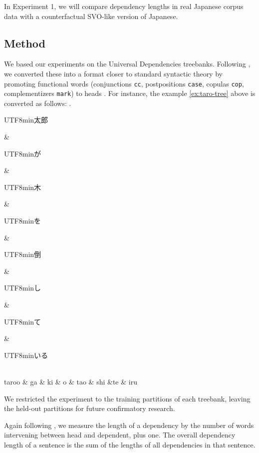 \documentclass[11pt,a4paper]{article}
\newcommand{\japanese}[1]{\begin{CJK}{UTF8}{min}#1\end{CJK}}
\begin{document}
In Experiment 1, we will compare dependency lengths in real Japanese corpus data with a counterfactual SVO-like version of Japanese.

\subsection{Method}

We based our experiments on the Universal Dependencies treebanks.
Following \cite{futrell2015largescale}, we converted these into a format closer to standard syntactic theory by promoting functional words
(conjunctions \texttt{cc}, 
postpositions \texttt{case},
copulas \texttt{cop},
complementizers \texttt{mark}) to heads \citep{osborne2019status}.
For instance, the example \ref{ex:taro-tree} above is converted as follows:
\ex.
\begin{dependency}[theme = simple]
   \begin{deptext}[column sep=1em]
          \japanese{太郎} \& \japanese{が} \& \japanese{木} \& \japanese{を} \& \japanese{倒} \& \japanese{し} \& \japanese{て} \& \japanese{いる} \\
          taroo \& ga \& ki \& o \& tao \& shi \&te \& iru \\ 
   \end{deptext}
\end{dependency}


We restricted the experiment to the training partitions of each treebank, leaving the held-out partitions for future confirmatory research. 

Again following \cite{futrell2015largescale}, we measure the length of a dependency by the number of words intervening between head and dependent, plus one. 
The overall dependency length of a sentence is the sum of the lengths of all dependencies in that sentence.
\end{document}
